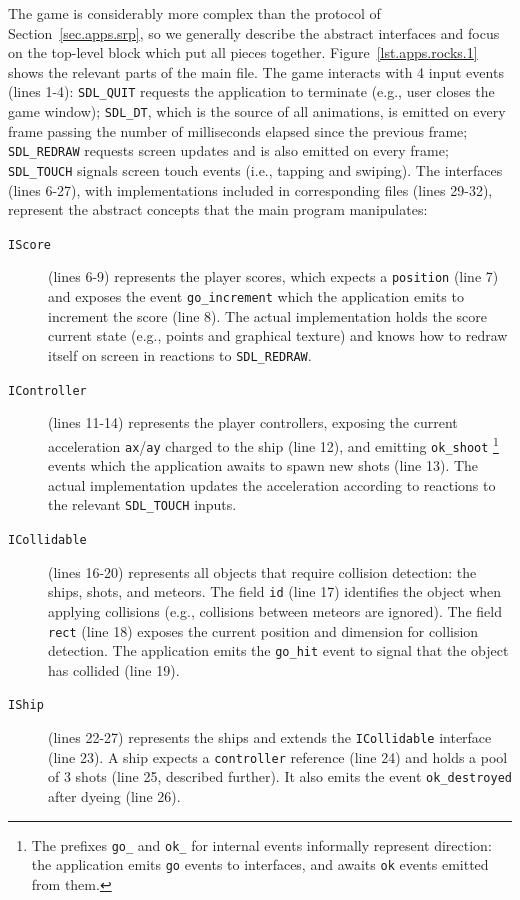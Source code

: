 \documentclass{sigplanconf}
\newcommand{\code}[1] {{\small{\texttt{#1}}}}
\newcommand{\1}{\;}
\newcommand{\2}{\;\;}
\newcommand{\3}{\;\;\;}
\newcommand{\5}{\;\;\;\;\;}
\begin{document}
The game is considerably more complex than the protocol of 
Section~\ref{sec.apps.srp}, so we generally describe the abstract interfaces 
and focus on the top-level block which put all pieces together.
%
Figure~\ref{lst.apps.rocks.1} shows the relevant parts of the main file.
%
The game interacts with 4 input events (lines 1-4):
\code{SDL\_QUIT} requests the application to terminate (e.g., user closes the 
game window);
\code{SDL\_DT}, which is the source of all animations, is emitted on every 
frame passing the number of milliseconds elapsed since the previous frame;
\code{SDL\_REDRAW} requests screen updates and is also emitted on every frame;
\code{SDL\_TOUCH} signals screen touch events (i.e., tapping and swiping).
%
The interfaces (lines 6-27), with implementations included in corresponding 
files (lines 29-32), represent the abstract concepts that the main program 
manipulates:
\begin{description}
\item[\code{IScore}] (lines 6-9) represents the player scores, which expects a 
\code{position} (line 7) and exposes the event \code{go\_increment} which the 
application emits to increment the score (line 8).
The actual implementation holds the score current state (e.g., points and 
graphical texture) and knows how to redraw itself on screen in reactions to 
\code{SDL\_REDRAW}.
\item[\code{IController}] (lines 11-14) represents the player controllers, 
exposing the current acceleration \code{ax}/\code{ay} charged to the ship (line 
12), and emitting \code{ok\_shoot}%
\footnote {
The prefixes \code{go\_} and \code{ok\_} for internal events informally 
represent direction: the application emits \code{go} events to interfaces, and 
awaits \code{ok} events emitted from them.
}
events which the application awaits to spawn new shots (line 13).
The actual implementation updates the acceleration according to reactions to 
the relevant \code{SDL\_TOUCH} inputs.
\item[\code{ICollidable}] (lines 16-20) represents all objects that require 
collision detection: the ships, shots, and meteors.
The field \code{id} (line 17) identifies the object when applying collisions 
(e.g., collisions between meteors are ignored).
The field \code{rect} (line 18) exposes the current position and dimension for 
collision detection.
The application emits the \code{go\_hit} event to signal that the object has 
collided (line 19).
\item[\code{IShip}] (lines 22-27) represents the ships and extends the 
\code{ICollidable} interface (line 23).
A ship expects a \code{controller} reference (line 24) and holds a pool of 3 
shots (line 25, described further).
It also emits the event \code{ok\_destroyed} after dyeing (line 26).
\end{description}
\end{document}
